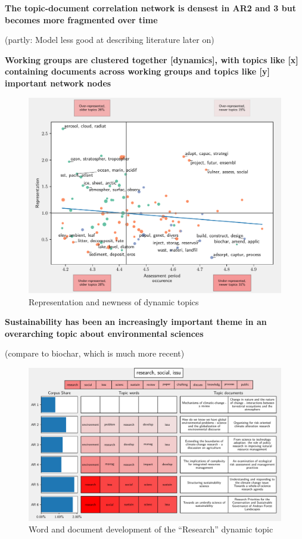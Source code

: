 \documentclass{article}
\begin{document}
\begin{linenumbers}
\bigskip
\noindent\textbf{The topic-document correlation network is densest in AR2 and 3 but becomes more fragmented over time}

(partly: Model less good at describing literature later on)

\bigskip
\noindent\textbf{Working groups are clustered together [dynamics], with topics like [x] containing documents across working groups and topics like [y] important network nodes}


\begin{figure}
	\begin{center}
		\includegraphics[width=1\linewidth]{plots/ipcc_representation/ipcc_rep_new665_all.pdf}
		\caption{Representation and newness of dynamic topics}
		\label{}
	\end{center}
\end{figure}


\bigskip
\noindent\textbf{Sustainability has been an increasingly important theme in an overarching topic about environmental sciences}

(compare to biochar, which is much more recent)

\begin{figure}
	\begin{center}
		\includegraphics[width=1\linewidth]{plots/single_topic_3_11046.pdf}
		\caption{Word and document development of the ``Research'' dynamic topic}
		\label{}
	\end{center}
\end{figure}


\end{linenumbers}
\end{document}
